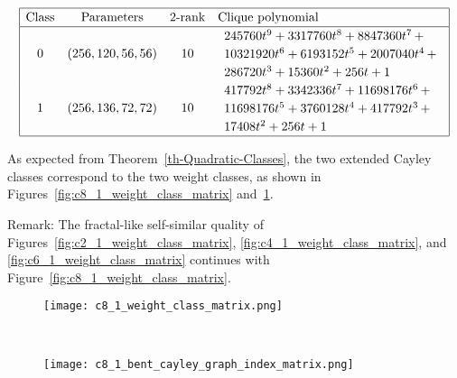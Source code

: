 \begin{table}[!bhpt] %
%
\small{}
\begin{align*}
\def\arraystretch{1.2}
\begin{array}{|cccl|}
\hline
\text{Class} &
\text{Parameters} &
\text{2-rank} &
\text{Clique polynomial}
\\
\hline
0 &
(256, 120, 56, 56) &
10 &
\begin{array}{l}
245760t^{9} + 3317760t^{8} + 8847360t^{7}
\,+
\\
 10321920t^{6} + 6193152t^{5} + 2007040t^{4}
\,+
\\
 286720t^{3} + 15360t^{2} + 256t + 1
\end{array}
\\
1 &
(256, 136, 72, 72) &
10 &
\begin{array}{l}
417792t^{8} + 3342336t^{7} + 11698176t^{6}
\,+
\\
 11698176t^{5} + 3760128t^{4} + 417792t^{3}
\,+
\\
 17408t^{2} + 256t + 1
\end{array}
\\
\hline
\end{array}
\end{align*}
%
\caption{$[f_{8,1}]$ extended Cayley classes.}
\label{tab-c8_1_EC_classes}
\end{table}

As expected from Theorem~\ref{th-Quadratic-Classes},
the two extended Cayley classes correspond to the two weight classes,
as shown in Figures~\ref{fig:c8_1_weight_class_matrix} and~\ref{fig:c8_1_bent_cayley_graph_index_matrix}.

Remark: The fractal-like self-similar quality of Figures~\ref{fig:c2_1_weight_class_matrix}, \ref{fig:c4_1_weight_class_matrix},
and \ref{fig:c6_1_weight_class_matrix} continues with Figure~\ref{fig:c8_1_weight_class_matrix}.

\begin{figure}[!bhpt] %
\centering
\begin{minipage}{.48\textwidth}
  \centering
  \texttt{[image: c8\_1\_weight\_class\_matrix.png]}
  \label{fig:c8_1_weight_class_matrix}
\end{minipage}%
~~~~
\begin{minipage}{.48\textwidth}
  \centering
  \texttt{[image: c8\_1\_bent\_cayley\_graph\_index\_matrix.png]}
  \label{fig:c8_1_bent_cayley_graph_index_matrix}
\end{minipage}
\end{figure}

